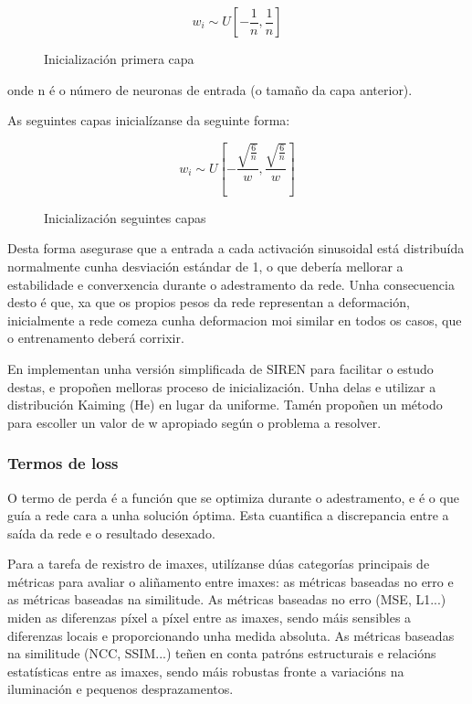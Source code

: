 \begin{figure}[tbp]
    \centering
    \[
    w_i \sim U\left[ -\frac{1}{n}, \frac{1}{n} \right]
    \]

\caption{Inicialización primera capa}
\end{figure}

onde n é o número de neuronas de entrada (o tamaño da capa anterior).

As seguintes capas inicialízanse da seguinte forma:
\begin{figure}[tbp]
    \centering
    \[
    w_i \sim U\left[ -\frac{\sqrt{\frac{6}{n}}}{w}, \frac{\sqrt{\frac{6}{n}}}{w} \right]
    \]
    \caption{Inicialización seguintes capas}
\end{figure}

Desta forma asegurase que a entrada a cada activación sinusoidal está distribuída normalmente cunha desviación estándar de 1,
 o que debería mellorar a estabilidade e converxencia durante o adestramento da rede.
Unha consecuencia desto é que, xa que os propios pesos da rede representan a deformación, inicialmente a rede comeza cunha deformacion moi similar en todos os casos, que o entrenamento deberá corrixir.

En \cite{sireninit} implementan unha versión simplificada de SIREN para facilitar o estudo destas, 
e propoñen melloras proceso de inicialización. Unha delas e utilizar a distribución Kaiming (He) en lugar da uniforme.
Tamén propoñen un método para escoller un valor de w apropiado según o problema a resolver.

\subsubsection{Termos de loss}
\label{subsubsec:Termos de loss}

O termo de perda é a función que se optimiza durante o adestramento, e é o que guía a rede cara a unha solución óptima.
Esta cuantifica a discrepancia entre a saída da rede e o resultado desexado.

Para a tarefa de rexistro de imaxes, utilízanse dúas categorías principais de métricas para avaliar o aliñamento entre imaxes: 
as métricas baseadas no erro e as métricas baseadas na similitude. As métricas baseadas no erro (MSE, L1...) miden as diferenzas píxel a píxel entre as imaxes, 
sendo máis sensibles a diferenzas locais e proporcionando unha medida absoluta. 
As métricas baseadas na similitude (NCC, SSIM...) teñen en conta patróns estructurais e relacións estatísticas entre as imaxes, sendo máis robustas fronte a variacións na iluminación e pequenos desprazamentos.
\cite{simmetric}

